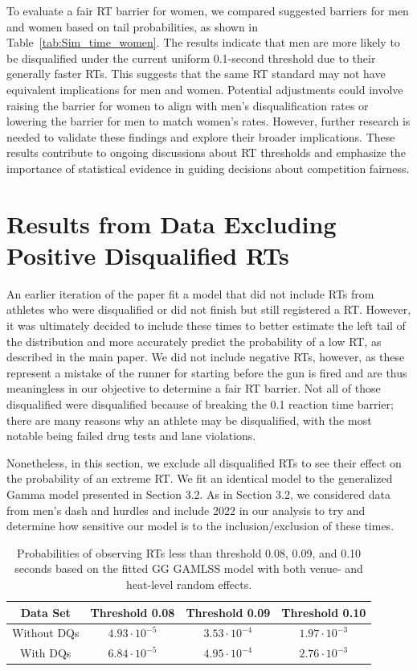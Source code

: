 \documentclass[12pt, letterpaper]{article}
\begin{document}
To evaluate a fair RT barrier for women, we compared suggested 
barriers for men and women based on tail probabilities, as shown in 
Table~\ref{tab:Sim_time_women}. The results indicate that men are more likely 
to be disqualified under the current uniform 0.1-second threshold due to their 
generally faster RTs. This suggests that the same RT standard may not 
have equivalent implications for men and women. Potential adjustments could 
involve raising the barrier for women to align with men’s disqualification rates 
or lowering the barrier for men to match women’s rates. However, further research 
is needed to validate these findings and explore their broader implications. These 
results contribute to ongoing discussions about RT thresholds and emphasize the 
importance of statistical evidence in guiding decisions about competition fairness.


\section{Results from Data Excluding Positive Disqualified RTs}

An earlier iteration of the paper fit a model that did not include RTs from
athletes who were disqualified or did not finish but still registered a RT.  
However, it was ultimately decided to include these times to better estimate the 
left tail of the distribution and more accurately predict the probability of a 
low RT, as described in the main paper. 
We did not include negative RTs, however, as these represent a mistake of the
runner for starting before the gun is fired and are thus meaningless in our
objective to determine a fair RT barrier.  Not all of those disqualified were
disqualified because of breaking the 0.1 reaction time barrier; there are many
reasons why an athlete may be disqualified, with the most notable being failed
drug tests and lane violations.  

Nonetheless, in this section,
we exclude all disqualified RTs to see their effect on the probability of an
extreme RT. We fit an identical model to the generalized Gamma model
presented in Section 3.2.  As in Section 3.2, we considered data from men's dash and
hurdles and include 2022 in our analysis to try and determine how sensitive
our model is to the inclusion/exclusion of these times.


\begin{table}
  \centering
   \caption{Probabilities of observing RTs less than threshold 0.08,
   0.09, and 0.10 seconds based on the
     fitted GG GAMLSS model with both venue- and heat-level
 random effects.}
   \begin{tabular}{c c c c}
    \toprule
    Data Set & Threshold 0.08 & Threshold 0.09 & Threshold 0.10  \\
    \midrule
    Without DQs & $4.93\cdot10^{-5}$ & $3.53\cdot10^{-4}$ &  $1.97\cdot10^{-3}$  \\
    With DQs & $6.84\cdot10^{-5}$ & $4.95\cdot10^{-4}$ & $2.76\cdot10^{-3}$ \\
    \bottomrule
   \end{tabular}
   \label{tab:DQSim_probability}
 \end{table}
\end{document}
